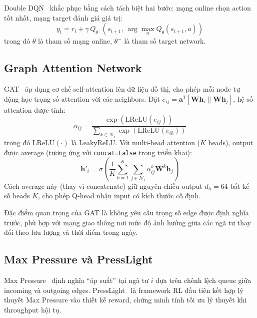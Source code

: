 \documentclass[conference]{IEEEtran}
\begin{document}
Double DQN~\cite{vanHasselt2016} khắc phục bằng cách tách biệt hai bước: mạng online chọn action tốt nhất, mạng target đánh giá giá trị:
\begin{equation}
    y_t = r_t + \gamma \, Q_{\theta^{-}}\!\left(s_{t+1},\, \arg\max_{a} Q_\theta(s_{t+1}, a)\right)
    \label{eq:ddqn}
\end{equation}
trong đó $\theta$ là tham số mạng online, $\theta^{-}$ là tham số target network.

\subsection{Graph Attention Network}

GAT~\cite{Velickovic2018} áp dụng cơ chế self-attention lên dữ liệu đồ thị, cho phép mỗi node tự động học trọng số attention với các neighbors. Đặt $e_{ij} = \mathbf{a}^T [\mathbf{W}\mathbf{h}_i \| \mathbf{W}\mathbf{h}_j]$, hệ số attention được tính:
\begin{equation}
    \alpha_{ij} = \frac{\exp(\text{LReLU}(e_{ij}))}{\displaystyle\sum_{k \in \mathcal{N}_i} \exp(\text{LReLU}(e_{ik}))}
    \label{eq:gat_attn}
\end{equation}
trong đó $\text{LReLU}(\cdot)$ là LeakyReLU. Với multi-head attention ($K$ heads), output được average (tương ứng với \texttt{concat=False} trong triển khai):
\begin{equation}
    \mathbf{h}'_i = \sigma\!\left(\frac{1}{K} \sum_{k=1}^{K} \sum_{j \in \mathcal{N}_i} \alpha_{ij}^k \mathbf{W}^k \mathbf{h}_j\right)
    \label{eq:gat_multihead}
\end{equation}
Cách average này (thay vì concatenate) giữ nguyên chiều output $d_h = 64$ bất kể số heads $K$, cho phép Q-head nhận input có kích thước cố định.

Đặc điểm quan trọng của GAT là không yêu cầu trọng số edge được định nghĩa trước, phù hợp với mạng giao thông nơi mức độ ảnh hưởng giữa các ngã tư thay đổi theo lưu lượng và thời điểm trong ngày.

\subsection{Max Pressure và PressLight}

Max Pressure~\cite{PressLight2019} định nghĩa ``áp suất'' tại ngã tư $i$ dựa trên chênh lệch queue giữa incoming và outgoing edges. PressLight~\cite{PressLight2019} là framework RL đầu tiên kết hợp lý thuyết Max Pressure vào thiết kế reward, chứng minh tính tối ưu lý thuyết khi throughput hội tụ.
\end{document}
